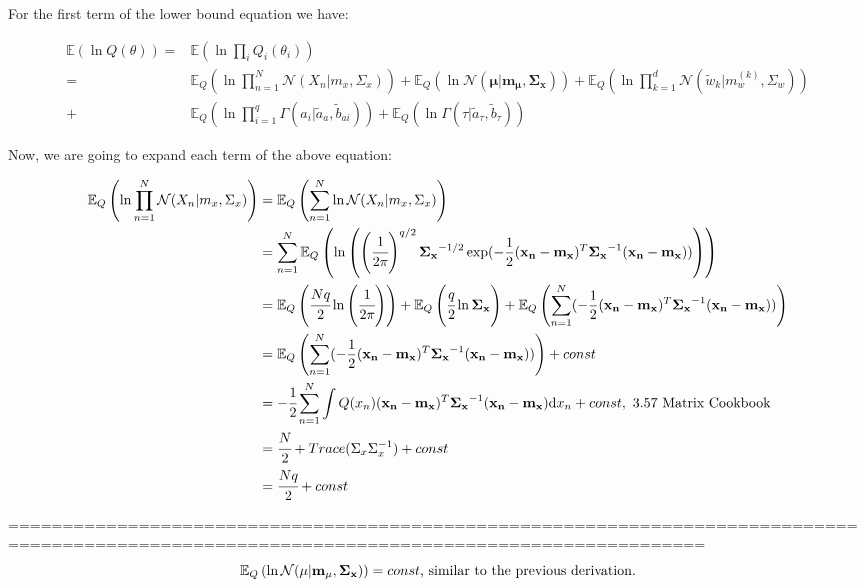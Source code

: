 \documentclass[11pt,notitlepage]{article}
\begin{document}
For the first term of the lower bound equation we have:


\begin{align*}
\mathbb{E}(\ln Q(\theta)) =& \mathbb{E}(\ln \prod_i Q_i(\theta_i))\\
=& \mathbb{E}_Q \left( \ln \prod_{n=1}^N \mathcal{N}(X_n|m_x,\Sigma_x)\right) + \mathbb{E}_Q \left( \ln \mathcal{N}(\mathbf{\mu}|\mathbf{m_{\mu}, \mathbf{\Sigma}_x})\right) + \mathbb{E}_Q \left( \ln \prod_{k=1}^d \mathcal{N} (\tilde{w}_k|m_w^{(k)},\Sigma_w)\right)\\
+& \mathbb{E}_Q \left( \ln \prod_{i=1}^q \Gamma (a_i | \tilde{a}_a, \tilde{b}_{ai})\right) + \mathbb{E}_Q \left( \ln \Gamma (\tau | \tilde{a}_{\tau}, \tilde{b}_{\tau})\right)
\end{align*}


Now, we are going to expand each term of the above equation:

\begin{align*}
\mathbb{E}_Q \left( \ln \prod_{n=1}^N \mathcal{N}(X_n|m_x,\Sigma_x)\right) &=\mathbb{E}_Q \left(\sum_{n=1}^N \ln \mathcal{N}(X_n|m_x,\Sigma_x) \right)\\
&=\sum_{n=1}^N \mathbb{E}_Q \left( \ln \left( \left( \cfrac{1}{2\pi}\right)^{q/2} \mathbf{\Sigma_x}^{-1/2} \exp (-\frac{1}{2}(\mathbf{x_n} - \mathbf{m_x})^T \mathbf{\Sigma_x}^{-1}(\mathbf{x_n} - \mathbf{m_x}) )\right) \right)\\
&=\mathbb{E}_Q\left( \cfrac{Nq}{2}\ln \left( \cfrac{1}{2\pi} \right) \right) + \mathbb{E}_Q\left( \cfrac{q}{2} \ln \mathbf{\Sigma_x}  \right) + \mathbb{E}_Q\left( \sum_{n=1}^N (-\frac{1}{2}(\mathbf{x_n} - \mathbf{m_x})^T \mathbf{\Sigma_x}^{-1}(\mathbf{x_n} - \mathbf{m_x})) \right)\\
&=\mathbb{E}_Q\left( \sum_{n=1}^N (-\frac{1}{2}(\mathbf{x_n} - \mathbf{m_x})^T \mathbf{\Sigma_x}^{-1}(\mathbf{x_n} - \mathbf{m_x})) \right) + const\\
&=-\cfrac{1}{2} \sum_{n=1}^N \int Q(x_n) (\mathbf{x_n} - \mathbf{m_x})^T \mathbf{\Sigma_x}^{-1}(\mathbf{x_n} - \mathbf{m_x})\mathrm{d}x_n + const,\text{ 3.57 Matrix Cookbook}\\
&= \cfrac{N}{2} + Trace(\Sigma_x \Sigma_x^{-1}) + const\\
&= \cfrac{Nq}{2} +const
\end{align*}

==============================================================================================================================================
\begin{equation*}
\mathbb{E}_Q \left( \ln \mathcal{N}(\mathbf{\mu}|\mathbf{m_{\mu}, \mathbf{\Sigma}_x})\right) =  const\text{, similar to the previous derivation.} \\
\end{equation*}
\end{document}
